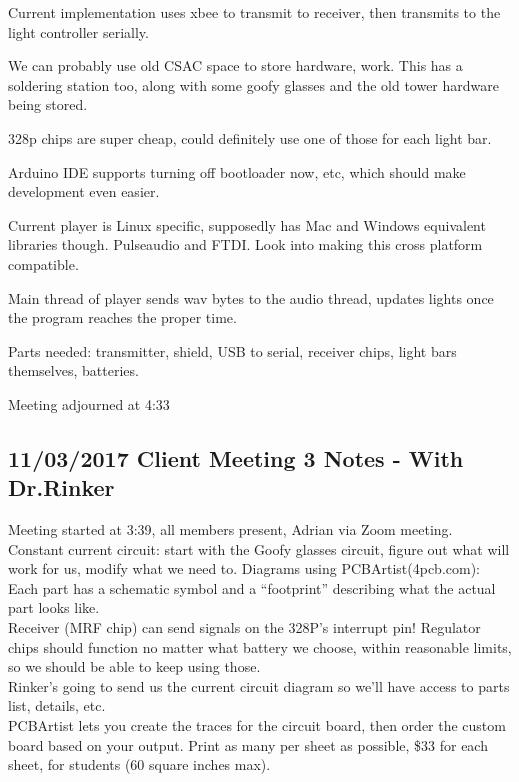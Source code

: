 \documentclass[12pt]{article}
\begin{document}
Current implementation uses xbee to transmit to receiver, then transmits to the light controller serially. 

We can probably use old CSAC space to store hardware, work. This has a soldering station too, along with some goofy glasses and the old tower hardware being stored. 

328p chips are super cheap, could definitely use one of those for each light bar. 

Arduino IDE supports turning off bootloader now, etc, which should make development even easier. 

Current player is Linux specific, supposedly has Mac and Windows equivalent libraries though. Pulseaudio and FTDI. Look into making this cross platform compatible.

Main thread of player sends wav bytes to the audio thread, updates lights once the program reaches the proper time. 

Parts needed: transmitter, shield, USB to serial, receiver chips, light bars themselves, batteries. 

Meeting adjourned at 4:33

	\clearpage
	\subsection{11/03/2017 Client Meeting 3 Notes - With Dr.Rinker}
	
	\noindent
	Meeting started at 3:39, all members present, Adrian via Zoom meeting.\\
	
	\noindent
	Constant current circuit: start with the Goofy glasses circuit, figure out what will work for us, 			modify what we need to. Diagrams using PCBArtist(4pcb.com): Each part has a schematic symbol and a 			“footprint” describing what the actual part looks like.\\

	\noindent
	Receiver (MRF chip) can send signals on the 328P’s interrupt pin! Regulator chips should function no 		matter what battery we choose, within reasonable limits, so we should be able to keep using those.\\ 
	
	\noindent	
	Rinker’s going to send us the current circuit diagram so we’ll have access to parts list, details, etc.\\ 
	
	\noindent
	PCBArtist lets you create the traces for the circuit board, then order the custom board based on your 		output. Print as many per sheet as possible, \$33 for each sheet, for students (60 square inches max).\\
	
\end{document}
